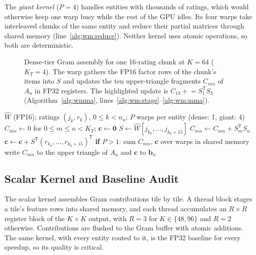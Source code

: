 The \textit{giant kernel} ($P=4$) handles entities with thousands of ratings, which would otherwise keep one warp busy while the rest of the GPU idles. Its four warps take interleaved chunks of the same entity and reduce their partial matrices through shared memory (line~\ref{alg:wm:reduce}). Neither kernel uses atomic operations, so both are deterministic.

\begin{figure}[!t]
\centering

\caption{Dense-tier Gram assembly for one 16-rating chunk at $K=64$ ($K_T=4$). The warp gathers the FP16 factor rows of the chunk's items into $S$ and updates the ten upper-triangle fragments $C_{mn}$ of $A_u$ in FP32 registers. The highlighted update is $C_{13} \mathrel{+}= S_1^{\mathsf{T}} S_3$ (Algorithm~\ref{alg:wmma}, lines~\ref{alg:wm:stage}--\ref{alg:wm:mma}).}
\label{fig:wmma}
\end{figure}

\begin{algorithm}[!t]
\caption{Tensor-core Gram assembly for one entity $u$. $S_m$ is the $m$-th block of 16 columns of $S$}
\label{alg:wmma}
\small
\begin{algorithmic}[1]
\REQUIRE $\widehat{W}$ (FP16); ratings $(j_k, r_k)$, $0 \le k < n_u$; $P$ warps per entity (dense: 1, giant: 4)
  \STATE $C_{mn} \gets 0$ for $0 \le m \le n < K_T$; $\mathbf{c} \gets \mathbf{0}$ 
    \STATE $S \gets \widehat{W}[j_{k_0}, \dots, j_{k_0+15}]$  \label{alg:wm:stage}
      \STATE $C_{mn} \gets C_{mn} + S_m^{\mathsf{T}} S_n$  \label{alg:wm:mma}
    \ENDFOR
    \STATE $\mathbf{c} \gets \mathbf{c} + S^{\mathsf{T}} (r_{k_0}, \dots, r_{k_0+15})^{\mathsf{T}}$
  \ENDFOR
\ENDFOR
\STATE \textbf{if} $P > 1$: sum $C_{mn}$, $\mathbf{c}$ over warps in shared memory \label{alg:wm:reduce}
\STATE write $C_{mn}$ to the upper triangle of $A_u$ and $\mathbf{c}$ to $\mathbf{b}_u$
\end{algorithmic}
\end{algorithm}

\subsection{Scalar Kernel and Baseline Audit}
\label{ssec:scalar}

The scalar kernel assembles Gram contributions tile by tile. A thread block stages a tile's feature rows into shared memory, and each thread accumulates an $R \times R$ register block of the $K \times K$ output, with $R=3$ for $K \in \{48, 96\}$ and $R=2$ otherwise. Contributions are flushed to the Gram buffer with atomic additions. The same kernel, with every entity routed to it, is the FP32 baseline for every speedup, so its quality is critical.

